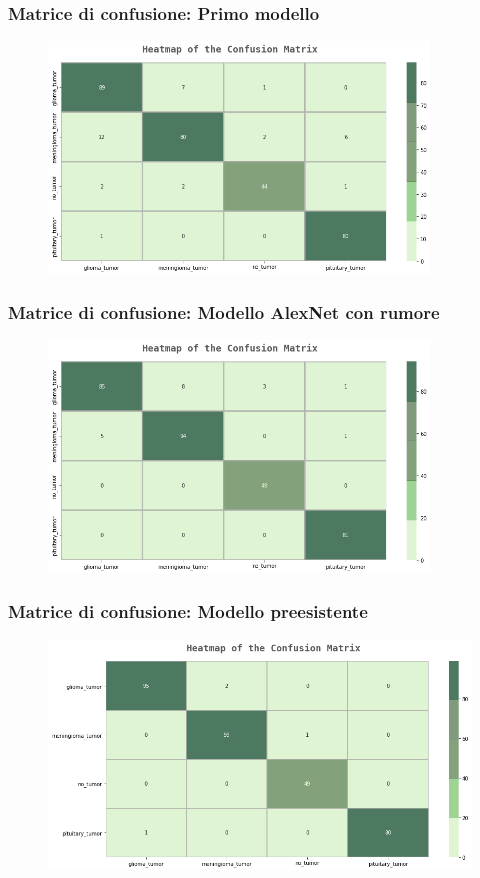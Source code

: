\documentclass{beamer}
\begin{document}
	\begin{frame}
		\frametitle{Matrice di confusione: Primo modello}
		\begin{figure}
			\includegraphics[width=0.9\textwidth]{conf-matrix-first.png}
		\end{figure}
	\end{frame}

\begin{frame}
	\frametitle{Matrice di confusione: Modello AlexNet con rumore}
	\begin{figure}
		\includegraphics[width=0.9\textwidth]{conf-matrix-alex.png}
	\end{figure}
	
\end{frame}


\begin{frame}
	\frametitle{Matrice di confusione: Modello preesistente}
	\begin{figure}

		\includegraphics[width=1\textwidth]{conf-matrix-pretrained.png}
	\end{figure}
\end{frame}
\end{document}
